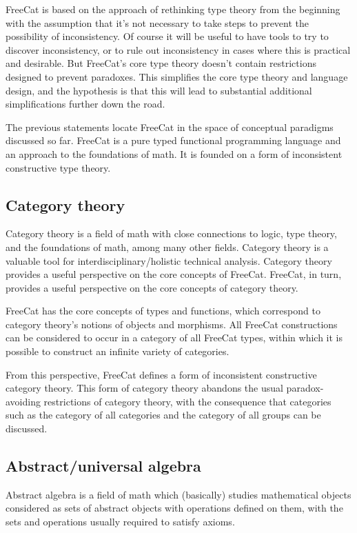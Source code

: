 \documentclass{article}
\begin{document}
FreeCat is based on the approach of rethinking type theory from the beginning with the assumption that it's not necessary to take steps to prevent the possibility of inconsistency. Of course it will be useful to have tools to try to discover inconsistency, or to rule out inconsistency in cases where this is practical and desirable. But FreeCat's core type theory doesn't contain restrictions designed to prevent paradoxes. This simplifies the core type theory and language design, and the hypothesis is that this will lead to substantial additional simplifications further down the road.

The previous statements locate FreeCat in the space of conceptual paradigms discussed so far. FreeCat is a pure typed functional programming language and an approach to the foundations of math. It is founded on a form of inconsistent constructive type theory.

\subsection{Category theory}

Category theory is a field of math with close connections to logic, type theory, and the foundations of math, among many other fields. Category theory is a valuable tool for interdisciplinary/holistic technical analysis. Category theory provides a useful perspective on the core concepts of FreeCat. FreeCat, in turn, provides a useful perspective on the core concepts of category theory.

FreeCat has the core concepts of types and functions, which correspond to category theory's notions of objects and morphisms. All FreeCat constructions can be considered to occur in a category of all FreeCat types, within which it is possible to construct an infinite variety of categories.

From this perspective, FreeCat defines a form of inconsistent constructive category theory. This form of category theory abandons the usual paradox-avoiding restrictions of category theory, with the consequence that categories such as the category of all categories and the category of all groups can be discussed.

\subsection{Abstract/universal algebra}

Abstract algebra is a field of math which (basically) studies mathematical objects considered as sets of abstract objects with operations defined on them, with the sets and operations usually required to satisfy axioms.
\end{document}
